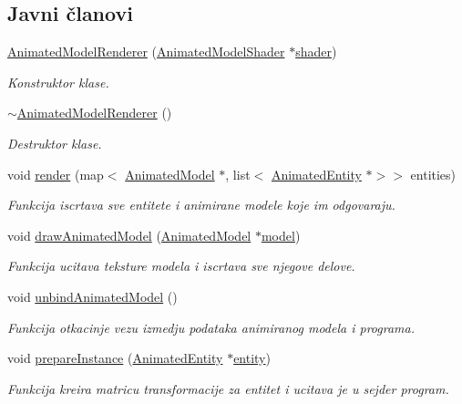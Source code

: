\subsection*{Javni članovi}
\begin{DoxyCompactItemize}
\item 
\hyperlink{classcore_1_1AnimatedModelRenderer_abb8518841908e242c3112ad872c5d8cb}{Animated\+Model\+Renderer} (\hyperlink{classshader_1_1AnimatedModelShader}{Animated\+Model\+Shader} $\ast$\hyperlink{classcore_1_1AnimatedModelRenderer_acb2349d2a687cead94b8538731cd436a}{shader})
\begin{DoxyCompactList}\small\item\em Konstruktor klase. \end{DoxyCompactList}\item 
\hyperlink{classcore_1_1AnimatedModelRenderer_aa04751cf1a8d43e45859b56621017602}{$\sim$\+Animated\+Model\+Renderer} ()
\begin{DoxyCompactList}\small\item\em Destruktor klase. \end{DoxyCompactList}\item 
void \hyperlink{classcore_1_1AnimatedModelRenderer_ab6e05f6e3eada213e56938cd0b929ebe}{render} (map$<$ \hyperlink{classmodel_1_1AnimatedModel}{Animated\+Model} $\ast$, list$<$ \hyperlink{classentity_1_1AnimatedEntity}{Animated\+Entity} $\ast$$>$$>$ entities)
\begin{DoxyCompactList}\small\item\em Funkcija iscrtava sve entitete i animirane modele koje im odgovaraju. \end{DoxyCompactList}\item 
void \hyperlink{classcore_1_1AnimatedModelRenderer_a8b495a2557e6ca557dfd5129a6400958}{draw\+Animated\+Model} (\hyperlink{classmodel_1_1AnimatedModel}{Animated\+Model} $\ast$\hyperlink{namespacecore_aa1479d4ed4dadbfe085b26662122b68a}{model})
\begin{DoxyCompactList}\small\item\em Funkcija ucitava teksture modela i iscrtava sve njegove delove. \end{DoxyCompactList}\item 
void \hyperlink{classcore_1_1AnimatedModelRenderer_a55f3ffa2f9ec2fc7b2f47691316cf87c}{unbind\+Animated\+Model} ()
\begin{DoxyCompactList}\small\item\em Funkcija otkacinje vezu izmedju podataka animiranog modela i programa. \end{DoxyCompactList}\item 
void \hyperlink{classcore_1_1AnimatedModelRenderer_af16329ff35cbfd45aae572e85e7d5f0d}{prepare\+Instance} (\hyperlink{classentity_1_1AnimatedEntity}{Animated\+Entity} $\ast$\hyperlink{namespacecore_aa710c0ea388433d2d80d1d1c67582eda}{entity})
\begin{DoxyCompactList}\small\item\em Funkcija kreira matricu transformacije za entitet i ucitava je u sejder program. \end{DoxyCompactList}\end{DoxyCompactItemize}
